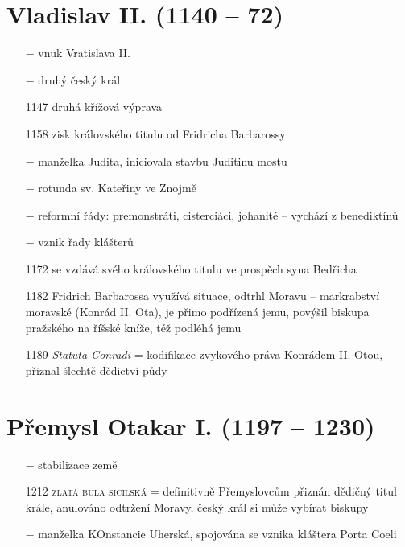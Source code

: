 \documentclass{article}
\begin{document}
\section*{Vladislav II. (1140 -- 72)}

\begin{itemize}
    \vspace{-0.5em}
    \setlength\itemsep{0.15em}
    \item[$-$] vnuk Vratislava II.
    \item[$-$] druhý český král
    \item[1147] druhá křížová výprava
    \item[1158] zisk královského titulu od Fridricha Barbarossy
    \item[$-$] manželka Judita, iniciovala stavbu Juditinu mostu
    \item[$-$] rotunda sv. Kateřiny ve Znojmě
    \item[$-$] reformní řády: premonstráti, cisterciáci, johanité -- vychází z benediktínů
    \item[$-$] vznik řady klášterů
    \item[1172] se vzdává svého královského titulu ve prospěch syna Bedřicha
\end{itemize}

\begin{itemize}
    \vspace{-0.5em}
    \setlength\itemsep{0.15em}
    \item[1182] Fridrich Barbarossa využívá situace, odtrhl Moravu -- markrabství moravské (Konrád II. Ota), je přimo podřízená jemu, povýšil biskupa pražského na říšské kníže, též podléhá jemu
    \item[1189] \textit{Statuta Conradi} = kodifikace zvykového práva Konrádem II. Otou, přiznal šlechtě dědictví půdy
\end{itemize}

\section*{Přemysl Otakar I. (1197 -- 1230)}
\begin{itemize}
    \vspace{-0.5em}
    \setlength\itemsep{0.15em}
    \item[$-$] stabilizace země
    \item[1212] \textsc{zlatá bula sicilská} = definitivně Přemyslovcům přiznán dědičný titul krále, anulováno odtržení Moravy, český král si může vybírat biskupy
    \item[$-$] manželka KOnstancie Uherská, spojována se vznika kláštera Porta Coeli
\end{itemize}
\end{document}
